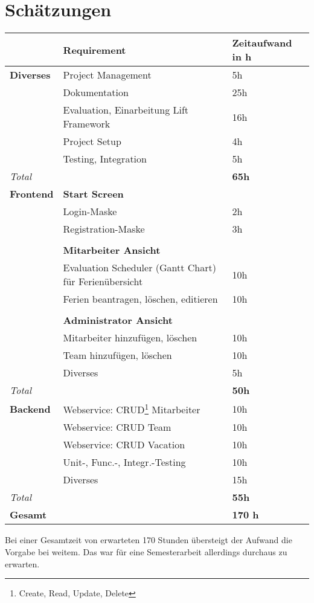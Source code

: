 \section{Sch\"atzungen}
\begin{tabular}{| p{2cm} |  p{6cm}  |  p{3.5cm} |}
  \hline
  & \textbf{Requirement} & \textbf{Zeitaufwand in h} \\
  \hline  \hline
  \textbf{Diverses}&Project Management & 5h\\
  &Dokumentation & 25h\\
  &Evaluation, Einarbeitung Lift Framework & 16h \\
  &Project Setup & 4h \\
  &Testing, Integration & 5h \\
  \hline
  \textit{Total} & & \textbf{65h}\\  
  
  
  \hline  \hline
  \textbf{Frontend} & \textbf{Start Screen} &  \\
  &Login-Maske & 2h\\
  &Registration-Maske & 3h\\ 
  & & \\
  
  &\textbf{Mitarbeiter Ansicht} & \\
  &Evaluation Scheduler (Gantt Chart) f\"ur Ferien\"ubersicht & 10h\\
  &Ferien beantragen, l\"oschen, editieren & 10h\\
  & & \\
  
  &\textbf{Administrator Ansicht} &\\
  &Mitarbeiter hinzuf\"ugen, l\"oschen & 10h\\
  &Team hinzuf\"ugen, l\"oschen & 10h\\
  & Diverses & 5h\\
  \hline
  \textit{Total} & & \textbf{50h}\\  
  \hline  \hline
  
  
  \textbf{Backend} & Webservice: CRUD\footnote{Create, Read, Update, Delete} Mitarbeiter & 10h\\
  & Webservice:  CRUD Team & 10h\\
  & Webservice:  CRUD Vacation & 10h\\
  & Unit-, Func.-, Integr.-Testing & 10h\\
  & Diverses & 15h \\
  \hline
  \textit{Total} & & \textbf{55h}\\  
  \hline  \hline

  \textbf{Gesamt} &  & \textbf{170 h}\\
  \hline
\end{tabular}
\newline\newline
Bei einer Gesamtzeit von erwarteten 170 Stunden \"ubersteigt der Aufwand die Vorgabe bei weitem. Das war f\"ur eine Semesterarbeit allerdings durchaus zu erwarten.